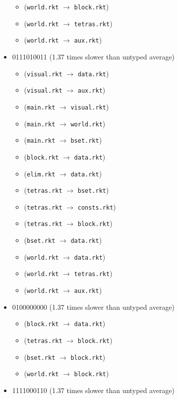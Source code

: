 \documentclass{article}
\newcommand{\mono}[1]{\texttt{#1}}
\begin{document}
\begin{itemize}
\begin{itemize}
  \item (\mono{world.rkt} $\rightarrow$ \mono{block.rkt})
  \item (\mono{world.rkt} $\rightarrow$ \mono{tetras.rkt})
  \item (\mono{world.rkt} $\rightarrow$ \mono{aux.rkt})
  \end{itemize}
\item 0111010011 (1.37 times slower than untyped average)
  \begin{itemize}
  \item (\mono{visual.rkt} $\rightarrow$ \mono{data.rkt})
  \item (\mono{visual.rkt} $\rightarrow$ \mono{aux.rkt})
  \item (\mono{main.rkt} $\rightarrow$ \mono{visual.rkt})
  \item (\mono{main.rkt} $\rightarrow$ \mono{world.rkt})
  \item (\mono{main.rkt} $\rightarrow$ \mono{bset.rkt})
  \item (\mono{block.rkt} $\rightarrow$ \mono{data.rkt})
  \item (\mono{elim.rkt} $\rightarrow$ \mono{data.rkt})
  \item (\mono{tetras.rkt} $\rightarrow$ \mono{bset.rkt})
  \item (\mono{tetras.rkt} $\rightarrow$ \mono{consts.rkt})
  \item (\mono{tetras.rkt} $\rightarrow$ \mono{block.rkt})
  \item (\mono{bset.rkt} $\rightarrow$ \mono{data.rkt})
  \item (\mono{world.rkt} $\rightarrow$ \mono{data.rkt})
  \item (\mono{world.rkt} $\rightarrow$ \mono{tetras.rkt})
  \item (\mono{world.rkt} $\rightarrow$ \mono{aux.rkt})
  \end{itemize}
\item 0100000000 (1.37 times slower than untyped average)
  \begin{itemize}
  \item (\mono{block.rkt} $\rightarrow$ \mono{data.rkt})
  \item (\mono{tetras.rkt} $\rightarrow$ \mono{block.rkt})
  \item (\mono{bset.rkt} $\rightarrow$ \mono{block.rkt})
  \item (\mono{world.rkt} $\rightarrow$ \mono{block.rkt})
  \end{itemize}
\item 1111000110 (1.37 times slower than untyped average)

\end{itemize}
\end{document}
